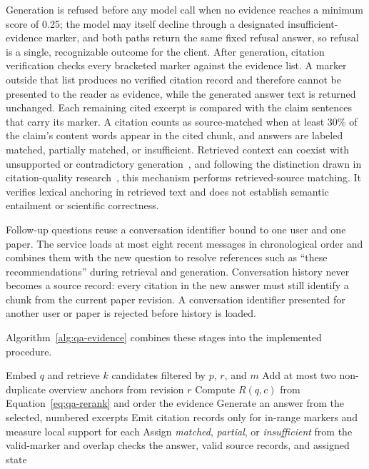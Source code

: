 Generation is refused before any model call when no evidence reaches a minimum score of 0.25; the model may itself decline through a designated insufficient-evidence marker, and both paths return the same fixed refusal answer, so refusal is a single, recognizable outcome for the client.
After generation, citation verification checks every bracketed marker against the evidence list. A marker outside that list produces no verified citation record and therefore cannot be presented to the reader as evidence, while the generated answer text is returned unchanged. Each remaining cited excerpt is compared with the claim sentences that carry its marker.
A citation counts as source-matched when at least 30\% of the claim's content words appear in the cited chunk, and answers are labeled matched, partially matched, or insufficient.
Retrieved context can coexist with unsupported or contradictory generation~\cite{niu2024ragtruth}, and following the distinction drawn in citation-quality research~\cite{gao2023alce}, this mechanism performs retrieved-source matching. It verifies lexical anchoring in retrieved text and does not establish semantic entailment or scientific correctness.

Follow-up questions reuse a conversation identifier bound to one user and one
paper. The service loads at most eight recent messages in chronological order
and combines them with the new question to resolve references such as ``these
recommendations'' during retrieval and generation. Conversation history never
becomes a source record: every citation in the new answer must still identify a
chunk from the current paper revision. A conversation identifier presented for
another user or paper is rejected before history is loaded.

Algorithm~\ref{alg:qa-evidence} combines these stages into the implemented procedure.

\begin{algorithm}[htbp]
  \caption{Revision-scoped answer generation and source checking}
  \label{alg:qa-evidence}
  Embed \(q\) and retrieve \(k\) candidates filtered by \(p\), \(r\), and \(m\)\;
  Add at most two non-duplicate overview anchors from revision \(r\)\;
  Compute \(R(q,c)\) from Equation~\ref{eq:qa-rerank} and order the evidence\;
  Generate an answer from the selected, numbered excerpts\;
  Emit citation records only for in-range markers and measure local support for each\;
  Assign \emph{matched}, \emph{partial}, or \emph{insufficient} from the valid-marker and overlap checks\;
  \Return the answer, valid source records, and assigned state\;
\end{algorithm}

